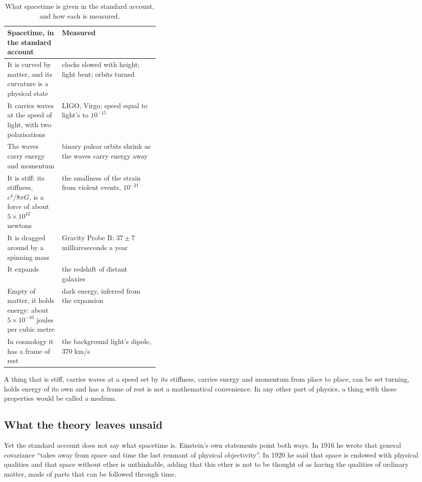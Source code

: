 \begin{table}[t]\centering\small
\caption{What spacetime is given in the standard account, and how each is measured.}
\begin{tabularx}{\linewidth}{@{}>{\raggedright}p{0.36\linewidth} X@{}}\toprule
\textbf{Spacetime, in the standard account} & \textbf{Measured}\\\midrule
It is curved by matter, and its curvature is a physical state & clocks slowed with height; light bent; orbits turned \citep{will2014}\\
It carries waves at the speed of light, with two polarisations & LIGO, Virgo; speed equal to light's to $10^{-15}$ \citep{abbott2016,abbott2017speed}\\
The waves carry energy and momentum & binary pulsar orbits shrink as the waves carry energy away \citep{isaacson1968,weisberg2016}\\
It is stiff: its stiffness, $c^4/8\pi G$, is a force of about $5\times10^{42}$ newtons & the smallness of the strain from violent events, $10^{-21}$ \citep{tenev2018}\\
It is dragged around by a spinning mass & Gravity Probe B: $37\pm7$ milliarcseconds a year \citep{everitt2011}\\
It expands & the redshift of distant galaxies\\
Empty of matter, it holds energy: about $5\times10^{-10}$ joules per cubic metre & dark energy, inferred from the expansion \citep{planck2018vi}\\
In cosmology it has a frame of rest & the background light's dipole, 370 km/s \citep{fixsen2009}\\\bottomrule
\end{tabularx}\label{tab:given}\end{table}

 A thing that is stiff, carries waves at a speed set by its stiffness, carries energy and momentum from place to place, can be set turning, holds energy of its own and has a frame of rest is not a mathematical convenience. In any other part of physics, a thing with these properties would be called a medium.

\subsection{What the theory leaves unsaid}

Yet the standard account does not say what spacetime is. Einstein's own statements point both ways. In 1916 he wrote that general covariance ``takes away from space and time the last remnant of physical objectivity''. In 1920 he said that space is endowed with physical qualities and that space without ether is unthinkable, adding that this ether is not to be thought of as having the qualities of ordinary matter, made of parts that can be followed through time.

